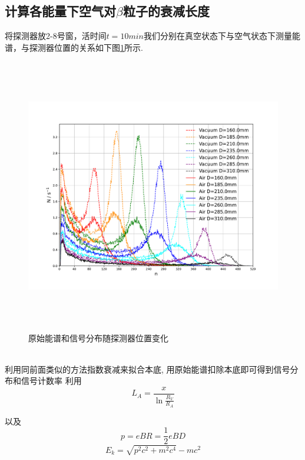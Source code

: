 \documentclass[a4paper]{article}
\begin{document}
\subsection{计算各能量下空气对$\beta$粒子的衰减长度}
将探测器放2-8号窗，活时间$t=10min$我们分别在真空状态下与空气状态下测量能谱，与探测器位置的关系如下图\ref{fig:fig5}所示. 
\begin{figure}[ht]
 \centering
 \includegraphics[height=12cm, width=16cm]{images/phyex5_fig1.pdf}
 \caption{原始能谱和信号分布随探测器位置变化}
 \label{fig:fig5}
\end{figure}\\
利用同前面类似的方法指数衰减来拟合本底, 用原始能谱扣除本底即可得到信号分布和信号计数率
\newpage
利用
\begin{equation}
L_A=\frac{x}{\ln{\frac{R_V}{R_A}}}
\end{equation}

以及
\begin{equation}
    p=eBR=\frac{1}{2}eBD
\end{equation}
\begin{equation}
    E_k=\sqrt{p^2c^2+m^2c^4}-mc^2    
\end{equation}
\end{document}
